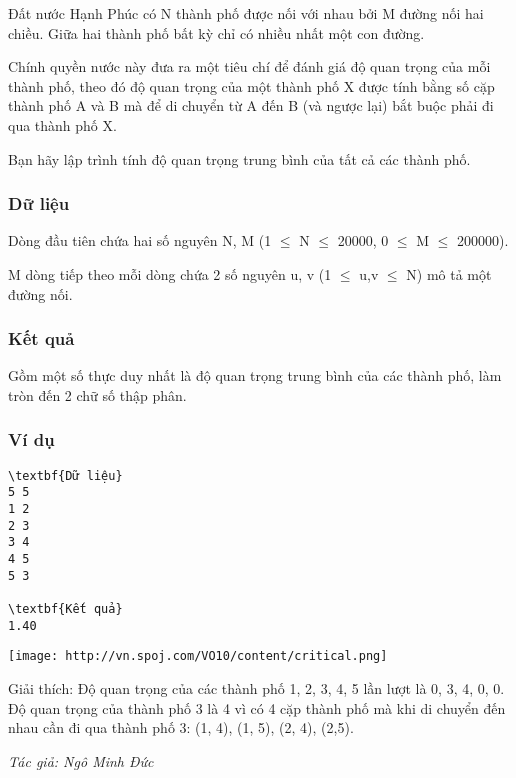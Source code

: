 

Đất nước Hạnh Phúc có N thành phố được nối với nhau bởi M đường nối hai chiều. Giữa hai thành phố bất kỳ chỉ có nhiều nhất một con đường.

Chính quyền nước này đưa ra một tiêu chí để đánh giá độ quan trọng của mỗi thành phố, theo đó độ quan trọng của một thành phố X được tính bằng số cặp thành phố A và B mà để di chuyển từ A đến B (và ngược lại) bắt buộc phải đi qua thành phố X.

Bạn hãy lập trình tính độ quan trọng trung bình của tất cả các thành phố.

\subsubsection{Dữ liệu}

Dòng đầu tiên chứa hai số nguyên N, M (1  $\le$  N  $\le$  20000, 0  $\le$  M  $\le$  200000).

M dòng tiếp theo mỗi dòng chứa 2 số nguyên u, v (1 $\le$ u,v  $\le$ N) mô tả một đường nối.

\subsubsection{Kết quả}

Gồm một số thực duy nhất là độ quan trọng trung bình của các thành phố, làm tròn đến 2 chữ số thập phân.

\subsubsection{Ví dụ}
\begin{verbatim}
\textbf{Dữ liệu}
5 5
1 2
2 3
3 4
4 5
5 3

\textbf{Kết quả}
1.40

\end{verbatim}


\texttt{[image: http://vn.spoj.com/VO10/content/critical.png]}

Giải thích: Độ quan trọng của các thành phố 1, 2, 3, 4, 5 lần lượt là 0, 3, 4, 0, 0. Độ quan trọng của thành phố 3 là 4 vì có 4 cặp thành phố mà khi di chuyển đến nhau cần đi qua thành phố 3: (1, 4), (1, 5), (2, 4), (2,5).

\emph{Tác giả: Ngô Minh Đức }
